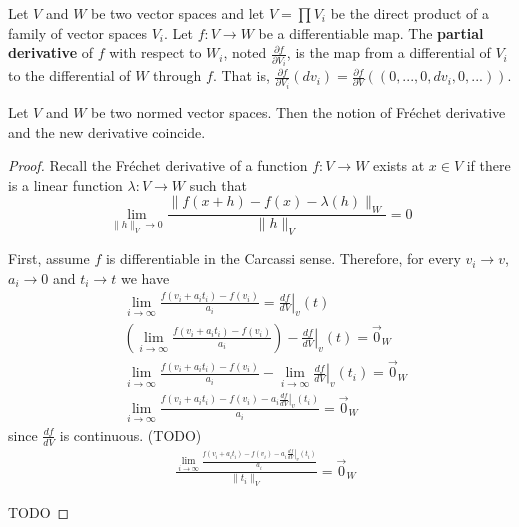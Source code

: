\documentclass[11pt,letterpaper,fleqn]{memoir}
\begin{document}
\begin{defn}
	Let $V$ and $W$ be two vector spaces and let $V=\prod V_i$ be the direct product of a family of vector spaces $V_i$. Let $f: V \to W$ be a differentiable map. The \textbf{partial derivative} of $f$ with respect to $W_i$, noted $\frac{\partial f}{\partial V_i}$, is the map from a differential of $V_i$ to the differential of $W$ through $f$. That is, $\frac{\partial f}{\partial V_i} (dv_i) = \frac{\partial f}{\partial V} \left( (0, ..., 0, dv_i, 0, ...) \right)$.
\end{defn}

\begin{conj}
	Let $V$ and $W$ be two normed vector spaces. Then the notion of Fr\'{e}chet derivative and the new derivative coincide.
\end{conj}

\begin{proof}
	Recall the Fr\'{e}chet derivative of a function $f: V \to W$ exists at $x \in V$ if there is a linear function $\lambda: V \to W$ such that
	\begin{equation}
	\lim_{\lVert h \rVert_{V} \to 0} \frac{\lVert f(x + h) - f(x) - \lambda(h) \rVert_{W}}{\lVert h \rVert_{V}} = 0 
	\end{equation}
	
	First, assume $f$ is differentiable in the Carcassi sense. Therefore, for every $v_i \to v$, $a_i \to 0$ and $t_i \to t$ we have
	\begin{equation}
		\begin{aligned}
	&\lim_{i \to \infty} \frac{f(v_{i} + a_{i}t_{i}) - f(v_{i})}{a_{i}} = \left.\frac{df}{dV}\right|_{v}(t) \\
	&\left( \lim_{i \to \infty} \frac{f(v_{i} + a_{i}t_{i}) - f(v_{i})}{a_{i}} \right) - \left.\frac{df}{dV}\right|_{v}(t) = \vec{0}_{W} \\
	&\lim_{i \to \infty} \frac{f(v_{i} + a_{i}t_{i}) - f(v_{i})}{a_{i}} - \lim_{i \to \infty}  \left.\frac{df}{dV}\right|_{v}(t_i) = \vec{0}_{W} \\
	&\lim_{i \to \infty} \frac{f(v_{i} + a_{i}t_{i}) - f(v_{i}) - a_{i}\left.\frac{df}{dV}\right|_{v}(t_i)}{a_{i}} = \vec{0}_{W}
		\end{aligned}
	\end{equation}
	since $\frac{df}{dV}$ is continuous. (TODO) 
	\begin{equation}
		\begin{aligned}
	&\frac{\lim_{i \to \infty} \frac{f(v_{i} + a_{i}t_{i}) - f(v_{i}) - a_{i}\left.\frac{df}{dV}\right|_{v}(t_i)}{a_{i}}}{\lVert t_i \rVert_{V}} = \vec{0}_{W}
		\end{aligned}
	\end{equation}

	TODO	
\end{proof}
\end{document}
